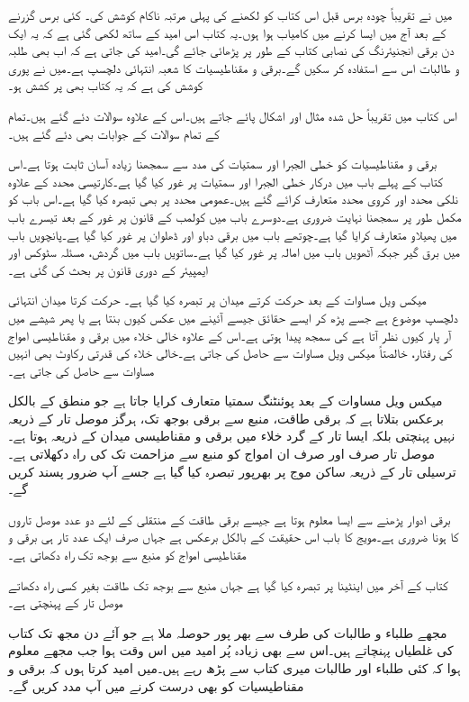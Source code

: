 میں نے تقریباً چودہ برس قبل اس کتاب کو لکھنے کی پہلی مرتبہ ناکام کوشش کی۔ کئی برس گزرنے کے بعد آج میں ایسا کرنے میں کامیاب ہوا ہوں۔یہ کتاب اس امید کے ساتھ لکھی گئی ہے کہ یہ ایک دن برقی انجنیئرنگ کی نصابی کتاب کے طور پر پڑھائی جائے گی۔امید کی جاتی ہے کہ اب بھی طلبہ و طالبات اس سے استفادہ کر سکیں گے۔برقی و مقناطیسیات کا شعبہ انتہائی دلچسپ ہے۔میں نے پوری کوشش کی ہے کہ یہ کتاب بھی پر کشش ہو۔


اس کتاب میں تقریباً  حل شدہ مثال اور  اشکال پائے جاتے ہیں۔اس کے علاوہ  سوالات دئے گئے ہیں۔تمام کے تمام سوالات کے جوابات بھی دئے گئے ہیں۔

برقی و مقناطیسیات کو خطی الجبرا اور سمتیات کی مدد سے سمجھنا زیادہ آسان ثابت ہوتا ہے۔اس کتاب کے پہلے باب میں درکار خطی الجبرا اور سمتیات پر غور کیا گیا ہے۔کارتیسی محدد کے علاوہ نلکی محدد اور کروی محدد متعارف کرائے گئے ہیں۔عمومی محدد پر بھی تبصرہ کیا گیا ہے۔اس باب کو مکمل طور پر سمجھنا نہایت ضروری ہے۔دوسرے باب میں کولمب کے قانون پر غور کے بعد تیسرے باب میں پھیلاو متعارف کرایا گیا ہے۔چوتھے باب میں برقی دباو اور ڈھلوان پر غور کیا گیا ہے۔پانچویں باب میں برق گیر جبکہ آٹھویں باب میں امالہ پر غور کیا گیا ہے۔ساتویں باب میں گردش، مسئلہ سٹوکس اور ایمپیئر کے دوری قانون پر بحث کی گئی ہے۔ 

میکس ویل مساوات کے بعد حرکت کرتے میدان پر تبصرہ کیا گیا ہے۔ حرکت کرتا میدان انتہائی دلچسپ موضوع ہے جسے پڑھ کر ایسے حقائق جیسے  آئینے میں عکس کیوں بنتا ہے یا پھر شیشے میں آر پار کیوں نظر آتا ہے کی سمجھ پیدا ہوتی ہے۔اس کے علاوہ خالی خلاء میں برقی و مقناطیسی امواج کی رفتار، خالصتاً میکس ویل مساوات سے حاصل کی جاتی ہے۔خالی خلاء کی قدرتی رکاوٹ بھی انہیں مساوات سے حاصل کی جاتی ہے۔

میکس ویل مساوات کے بعد پوئنٹنگ سمتیا متعارف کرایا جاتا ہے جو منطق کے بالکل برعکس بتلاتا ہے کہ برقی طاقت، منبع سے برقی بوجھ تک، ہرگز موصل تار کے ذریعہ نہیں پہنچتی بلکہ ایسا تار کے گرد خلاء میں برقی و مقناطیسی میدان کے ذریعہ ہوتا ہے۔موصل تار صرف اور صرف ان امواج کو منبع سے مزاحمت تک کی راہ دکھلاتی ہے۔ترسیلی تار کے ذریعہ ساکن موج پر بھرپور تبصرہ کیا گیا ہے جسے آپ ضرور پسند کریں گے۔

برقی ادوار پڑھنے سے ایسا معلوم ہوتا ہے جیسے برقی طاقت کے منتقلی کے لئے دو عدد موصل تاروں کا ہونا ضروری ہے۔مویج کا باب اس حقیقت کے بالکل برعکس ہے جہاں صرف ایک عدد تار  ہی برقی و مقناطیسی امواج کو منبع سے بوجھ تک راہ دکھاتی ہے۔

کتاب کے آخر میں اینٹینا پر تبصرہ کیا گیا ہے جہاں منبع سے بوجھ تک طاقت بغیر کسی راہ دکھاتے موصل تار کے پہنچتی ہے۔

مجھے طلباء و طالبات کی طرف سے بھر پور حوصلہ ملا ہے جو آئے دن مجھ تک کتاب کی غلطیاں پہنچاتے ہیں۔اس سے بھی زیادہ پُر امید میں اس وقت ہوا جب مجھے معلوم ہوا کہ کئی طلباء اور طالبات میری کتاب سے پڑھ رہے ہیں۔میں امید کرتا ہوں کہ برقی و مقناطیسیات کو بھی درست کرنے میں آپ مدد کریں گے۔

